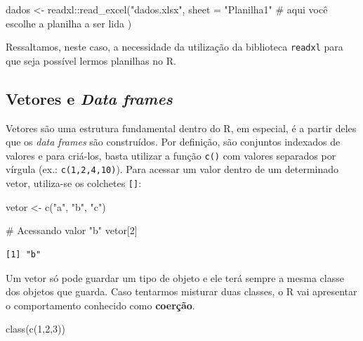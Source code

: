 \documentclass[
  12pt,
  letterpaper,
  DIV=11,
  numbers=noendperiod]{scrreprt}
\newenvironment{Shaded}{\begin{snugshade}}{\end{snugshade}}
\newcommand{\AttributeTok}[1]{\textcolor[rgb]{0.40,0.45,0.13}{#1}}
\newcommand{\CommentTok}[1]{\textcolor[rgb]{0.37,0.37,0.37}{#1}}
\newcommand{\DecValTok}[1]{\textcolor[rgb]{0.68,0.00,0.00}{#1}}
\newcommand{\FunctionTok}[1]{\textcolor[rgb]{0.28,0.35,0.67}{#1}}
\newcommand{\NormalTok}[1]{\textcolor[rgb]{0.00,0.23,0.31}{#1}}
\newcommand{\OtherTok}[1]{\textcolor[rgb]{0.00,0.23,0.31}{#1}}
\newcommand{\SpecialCharTok}[1]{\textcolor[rgb]{0.37,0.37,0.37}{#1}}
\newcommand{\StringTok}[1]{\textcolor[rgb]{0.13,0.47,0.30}{#1}}
\theoremstyle{definition}
\theoremstyle{exemplo}
\begin{document}
\begin{Shaded}
\begin{Highlighting}[]
\NormalTok{dados }\OtherTok{\textless{}{-}}\NormalTok{ readxl}\SpecialCharTok{::}\FunctionTok{read\_excel}\NormalTok{(}\StringTok{"dados.xlsx"}\NormalTok{,}
  \AttributeTok{sheet =} \StringTok{"Planilha1"} \CommentTok{\# aqui você escolhe a planilha a ser lida}
\NormalTok{)}
\end{Highlighting}
\end{Shaded}

\noindent Ressaltamos, neste caso, a necessidade da utilização da
biblioteca \texttt{readxl} para que seja possível lermos planilhas no R.

\subsection{\texorpdfstring{Vetores e \emph{Data
frames}}{Vetores e Data frames}}\label{vetores-e-data-frames}

Vetores são uma estrutura fundamental dentro do R, em especial, é a
partir deles que os \emph{data frames} são construídos. Por definição,
são conjuntos indexados de valores e para criá-los, basta utilizar a
função \texttt{c()} com valores separados por vírgula (ex.:
\texttt{c(1,2,4,10)}). Para acessar um valor dentro de um determinado
vetor, utiliza-se os colchetes \texttt{{[}{]}}:

\begin{Shaded}
\begin{Highlighting}[]
\NormalTok{vetor }\OtherTok{\textless{}{-}} \FunctionTok{c}\NormalTok{(}\StringTok{"a"}\NormalTok{, }\StringTok{"b"}\NormalTok{, }\StringTok{"c"}\NormalTok{)}

\CommentTok{\# Acessando valor "b"}
\NormalTok{vetor[}\DecValTok{2}\NormalTok{]}
\end{Highlighting}
\end{Shaded}

\begin{verbatim}
[1] "b"
\end{verbatim}

\noindent Um vetor só pode guardar um tipo de objeto e ele terá sempre a
mesma classe dos objetos que guarda. Caso tentarmos misturar duas
classes, o R vai apresentar o comportamento conhecido como
\textbf{coerção}.

\begin{Shaded}
\begin{Highlighting}[]
\FunctionTok{class}\NormalTok{(}\FunctionTok{c}\NormalTok{(}\DecValTok{1}\NormalTok{,}\DecValTok{2}\NormalTok{,}\DecValTok{3}\NormalTok{))}
\end{Highlighting}
\end{Shaded}
\end{document}
